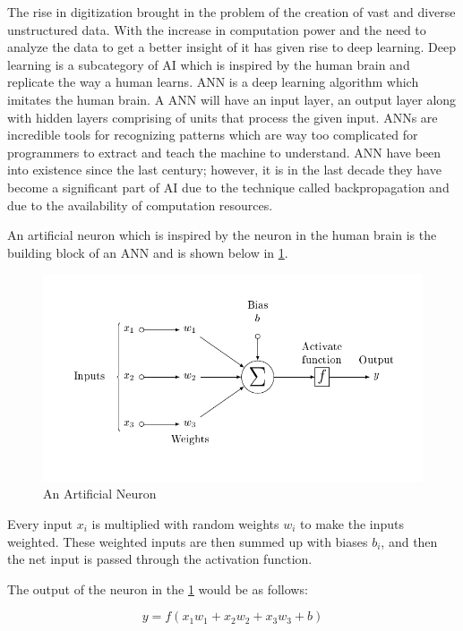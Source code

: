 The rise in digitization brought in the problem of the creation of vast and diverse unstructured data. With the increase in computation power and the need to analyze the data to get a better insight of it has given rise to deep learning. Deep learning is a subcategory of \gls{AI} which is inspired by the human brain and replicate the way a human learns. \gls{ANN} is a deep learning algorithm which imitates the human brain. A \gls{ANN} will have an input layer, an output layer along with hidden layers comprising of units that process the given input. \glspl{ANN} are incredible tools for recognizing patterns which are way too complicated for programmers to extract and teach the machine to understand. \gls{ANN} have been into existence since the last century; however, it is in the last decade they have become a significant part of \gls{AI} due to the technique called backpropagation and due to the availability of computation resources. 

An artificial neuron which is inspired by the neuron in the human brain is the building block of an \gls{ANN} and is shown below in \ref{fig:neuron}. 

\begin{figure}[!ht]
    \centering
    \captionsetup{justification=centering,margin=2cm}
    \includegraphics[width=12cm]{pics/ArtificialNeuronModel.png}
    \caption{An Artificial Neuron}
    \label{fig:neuron}
\end{figure}

Every input $x_{i}$ is multiplied with random weights $w_{i}$ to make the inputs weighted. These weighted inputs are then summed up with biases $b_{i}$, and then the net input is passed through the activation function.


The output of the neuron in the \ref{fig:neuron} would be as follows:

\begin{equation}
y=f(x_{1}w_{1}+x_{2}w_{2}+x_{3}w_{3}+b)
\label{eq:NNformula}
\end{equation}

